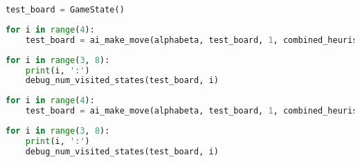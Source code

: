 \begin{lstlisting}[language=Python]
%run othello_test_util.ipynb
\end{lstlisting}

\begin{lstlisting}[language=Python]
test_board = GameState()
\end{lstlisting}

\begin{lstlisting}[language=Python]
for i in range(4):
    test_board = ai_make_move(alphabeta, test_board, 1, combined_heuristic)
\end{lstlisting}

\begin{lstlisting}[language=Python]
for i in range(3, 8):
    print(i, ':')
    debug_num_visited_states(test_board, i)
\end{lstlisting}

\begin{lstlisting}[language=Python]
for i in range(4):
    test_board = ai_make_move(alphabeta, test_board, 1, combined_heuristic)
\end{lstlisting}

\begin{lstlisting}[language=Python]
for i in range(3, 8):
    print(i, ':')
    debug_num_visited_states(test_board, i)
\end{lstlisting}
